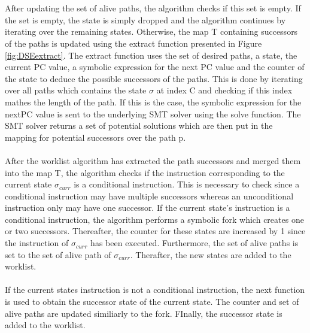 \documentclass{kththesis}
\begin{document}
\\ \\
After updating the set of alive paths, the algorithm checks if this set is empty. If the set is empty, the state is simply dropped and the algorithm continues by iterating over the remaining states. Otherwise, the map T containing successors of the paths is updated using the extract function presented in Figure \ref{fig:DSEextract}. The extract function uses the set of desired paths, a state, the current PC value, a symbolic expression for the next PC value and the counter of the state to deduce the possible successors of the paths. This is done by iterating over all paths which contains the state $\sigma$ at index C and checking if this index mathes the length of the path. If this is the case, the symbolic expression for the nextPC value is sent to the underlying SMT solver using the solve function. The SMT solver returns a set of potential solutions which are then put in the mapping for potential successors over the path p.
\\ \\
After the worklist algorithm has extracted the path successors and merged them into the map T, the algorithm checks if the instruction corresponding to the current state $\sigma_{curr}$ is a conditional instruction. This is necessary to check since a conditional instruction may have multiple successors whereas an unconditional instruction only may have one successor. If the current state's instruction is a conditional instruction, the algorithm performs a symbolic fork which creates one or two successors. Thereafter, the counter for these states are increased by 1 since the instruction of $\sigma_{curr}$ has been executed. Furthermore, the set of alive paths is set to the set of alive path of $\sigma_{curr}$. Therafter, the new states are added to the worklist.
\\ \\
If the current states instruction is not a conditional instruction, the next function is used to obtain the successor state of the current state. The counter and set of alive paths are updated similiarly to the fork. FInally, the successor state is added to the worklist.
\end{document}

